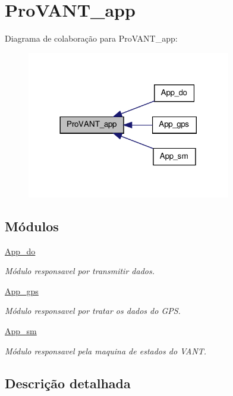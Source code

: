 \hypertarget{group__ProVANT__app}{\section{Pro\-V\-A\-N\-T\-\_\-app}
\label{group__ProVANT__app}
}
Diagrama de colaboração para Pro\-V\-A\-N\-T\-\_\-app\-:
\nopagebreak
\begin{figure}[H]
\begin{center}
\leavevmode
\includegraphics[width=252pt]{group__ProVANT__app}
\end{center}
\end{figure}
\subsection*{Módulos}
\begin{DoxyCompactItemize}
\item 
\hyperlink{group__app__do}{App\-\_\-do}
\begin{DoxyCompactList}\small\item\em Módulo responsavel por transmitir dados. \end{DoxyCompactList}\item 
\hyperlink{group__app__gps}{App\-\_\-gps}
\begin{DoxyCompactList}\small\item\em Módulo responsavel por tratar os dados do G\-P\-S. \end{DoxyCompactList}\item 
\hyperlink{group__app__sm}{App\-\_\-sm}
\begin{DoxyCompactList}\small\item\em Módulo responsavel pela maquina de estados do V\-A\-N\-T. \end{DoxyCompactList}\end{DoxyCompactItemize}


\subsection{Descrição detalhada}
